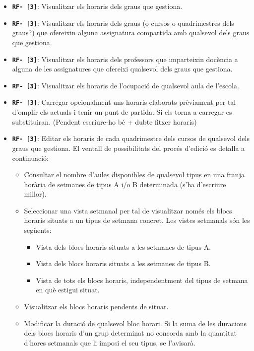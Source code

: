 \documentclass[a4paper,12pt]{ThesisStyle}
\begin{document}
\begin{itemize}
  \item \texttt{\textbf{RF- [3]}}: Visualitzar els horaris dels graus que gestiona.
  \item \texttt{\textbf{RF- [3]}}: Visualitzar els horaris dels graus (o cursos o quadrimestres dels graus?) que ofereixin alguna assignatura compartida amb qualsevol dels graus que gestiona.
  \item \texttt{\textbf{RF- [3]}}: Visualitzar els horaris dels professors que imparteixin docència a alguna de les assignatures que ofereixi qualsevol dels graus que gestiona.
  \item \texttt{\textbf{RF- [3]}}: Visualitzar els horaris de l'ocupació de qualsevol aula de l'escola.
  \item \texttt{\textbf{RF- [3]}}: Carregar opcionalment uns horaris elaborats prèviament per tal d'omplir els actuals i tenir un punt de partida. Si els torna a carregar es substituiran. (Pendent escriure-ho bé + dubte fitxer horaris)
  \item \texttt{\textbf{RF- [3]}}: Editar els horaris de cada quadrimestre dels cursos de qualsevol dels graus que gestiona. El ventall de possibilitats del procés d'edició es detalla a continuació:
    \begin{itemize}
      \item Consultar el nombre d'aules disponibles de qualsevol tipus en una franja horària de setmanes de tipus A i/o B determinada (s'ha d'escriure millor).
      \item Seleccionar una vista setmanal per tal de visualitzar només els blocs horaris situats a un tipus de setmana concret. Les vistes setmanals són les següents:
        \begin{itemize}
          \item Vista dels blocs horaris situats a les setmanes de tipus A.
          \item Vista dels blocs horaris situats a les setmanes de tipus B.
          \item Vista de tots els blocs horaris, independentment del tipus de setmana en què estigui situat.
        \end{itemize}
      \item Visualitzar els blocs horaris pendents de situar.
      
      \item Modificar la duració de qualsevol bloc horari. Si la suma de les duracions dels blocs horaris d'un grup determinat no concorda amb la quantitat d'hores setmanals que li imposi el seu tipus, se l'avisarà.
      

\end{itemize}
\end{itemize}
\end{document}
